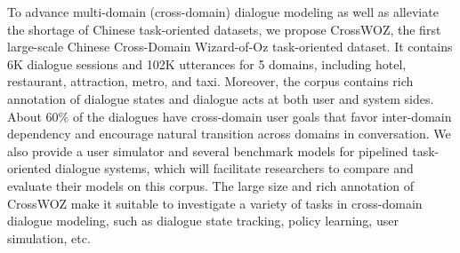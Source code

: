 To advance multi-domain (cross-domain) dialogue modeling as well as alleviate the shortage of Chinese task-oriented datasets, we propose CrossWOZ, the first large-scale Chinese Cross-Domain Wizard-of-Oz task-oriented dataset. It contains 6K dialogue sessions and 102K utterances for 5 domains, including hotel, restaurant, attraction, metro, and taxi. Moreover, the corpus contains rich annotation of dialogue states and dialogue acts at both user and system sides. About 60\% of the dialogues have cross-domain user goals that favor inter-domain dependency and encourage natural transition across domains in conversation. We also provide a user simulator and several benchmark models for pipelined task-oriented dialogue systems, which will facilitate researchers to compare and evaluate their models on this corpus. The large size and rich annotation of CrossWOZ make it suitable to investigate a variety of tasks in cross-domain dialogue modeling, such as dialogue state tracking, policy learning, user simulation, etc.